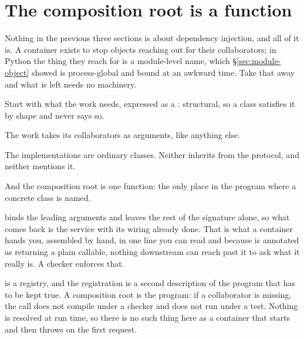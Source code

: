 \section{The composition root is a function}
\label{sec:composition-root}

Nothing in the previous three sections is about dependency injection, and
all of it is. A container exists to stop objects reaching out for their
collaborators; in Python the thing they reach for is a module-level name,
which \S\ref{sec:module-object} showed is process-global and bound at an
awkward time. Take that away and what is left needs no machinery.

Start with what the work needs, expressed as a : structural,
so a class satisfies it by shape and never says so.


\noindent
The work takes its collaborators as arguments, like anything else.


\noindent
The implementations are ordinary classes. Neither inherits from the
protocol, and neither mentions it.


\noindent
And the composition root is one function: the only place in the program
where a concrete class is named.



\noindent
{} binds the leading arguments and leaves the rest of
the signature alone, so what comes back is the service with its wiring
already done. That is what a container hands you, assembled by hand, in one
line you can read \dash{} and because  is annotated as
returning a plain callable, nothing downstream can reach past it to ask what
it really is. A checker enforces that.

\begin{csbox}
 is a registry, and the registration is a second
description of the program that has to be kept true. A composition root is
the program: if a collaborator is missing, the call does not compile under a
checker and does not run under a test. Nothing is resolved at run time, so
there is no such thing here as a container that starts and then throws on
the first request.
\end{csbox}

